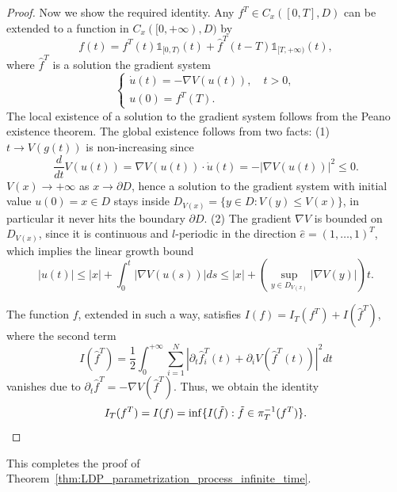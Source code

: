 \documentclass[11pt]{article}
\numberwithin{equation}{section}
\theoremstyle{definition}
\begin{document}
\begin{proof}
Now we show the required identity. Any $f^{T} \in C_{x}([0,T],D)$ can be extended to a function in $C_{x}([0,+\infty),D)$ by 
\[
    f(t) = f^{T}(t)\mathds{1}_{[0,T)}(t) + \hat{f}^{T}(t-T)\mathds{1}_{[T,+\infty)}(t),
\]
where $\hat{f}^{T}$ is a solution the gradient system 
\[
\begin{cases}
    \dot u(t) = -\nabla V(u(t)), \quad t>0,\\
    u(0) = f^{T}(T).
\end{cases}
\]
The local existence of a solution to the gradient system follows from the Peano existence theorem. The global existence follows from two facts: (1) $t\to V(g(t))$ is non-increasing since 
\[
    \frac{d}{dt}V(u(t)) 
    = \nabla V(u(t)) \cdot \dot u(t) 
    = -|\nabla V(u(t))|^2\le 0.
\]
$V(x)\to +\infty $ as $x\to\partial D$, hence a solution to the gradient system with initial value $u(0)=x\in D$ stays inside $D_{V(x)}=\{y\in D: V(y)\le V(x)\}$, in particular it never hits the boundary $\partial D$. (2) The gradient $\nabla V$ is bounded on $D_{V(x)}$, since it is continuous and $l$-periodic in the direction $\hat e =(1,\dots,1)^{T}$, which implies the linear growth bound 
\[
    |u(t)|
    \le |x|+\int_{0}^{t}|\nabla V(u(s))|ds
    \le |x| + (\sup_{y\in D_{V(x)}}|\nabla V(y)|) t.
\]


The function $f$, extended in such a way, satisfies $I(f) = I_{T}(f^{T})+ I(\hat{f}^{T})$, where the second term 
\[
    I(\hat{f}^{T})
    =\frac{1}{2}\int_{0}^{+\infty}\sum\limits_{i=1}^{N}\left|\partial_{t}\hat{f}^{T}_{i}(t) + \partial_{i} V(\hat{f}^{T}(t))\right|^2dt
\]
vanishes due to $\partial_{t} \hat{f}^{T} = -\nabla V (\hat{f}^{T})$. Thus, we obtain the identity 
\[
     I_{T}(f^{T}) = I(f) = \inf\{I(\tilde f): \tilde f \in \pi_{T}^{-1}(f^{T})\}.\qedhere
\]
\end{proof}
\noindent This completes the proof of Theorem~\ref{thm:LDP_parametrization_process_infinite_time}.
\end{document}

